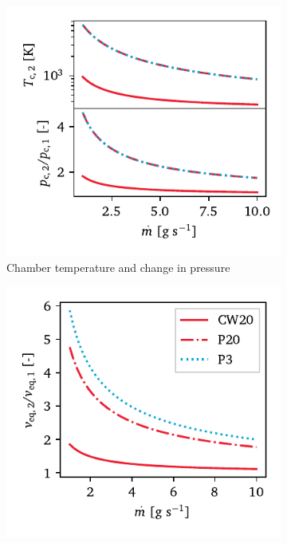             \begin{figure}[h]
                \centering
                \begin{subfigure}[t]{0.48\textwidth}
                    \centering
                    \includegraphics[width=\textwidth]{assets/4 models/thermo_hotThrust.pdf}
                    \caption{Chamber temperature and change in pressure}
                    \label{fig:change_hotThrust_Tp}
                \end{subfigure}
                \hfil
                \begin{subfigure}[t]{0.48\textwidth}
                    \centering
                    \includegraphics[width=\textwidth]{assets/4 models/veRatio_hotThrust.pdf}

\end{subfigure}
\end{figure}
